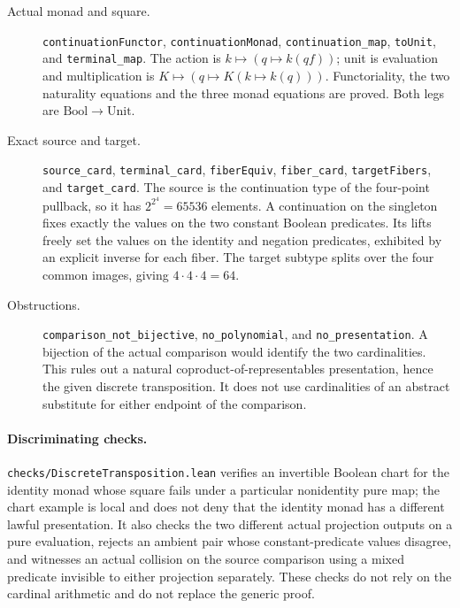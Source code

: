 \documentclass[11pt]{article}
\begin{document}
\begin{description}
\item[Actual monad and square.]
\nolinkurl{continuationFunctor}, \nolinkurl{continuationMonad},
\nolinkurl{continuation_map}, \nolinkurl{toUnit}, and
\nolinkurl{terminal_map}. The action is $k\mapsto(q\mapsto k(qf))$;
unit is evaluation and multiplication is
$K\mapsto(q\mapsto K(k\mapsto k(q)))$. Functoriality, the two
naturality equations and the three monad equations are proved. Both legs
are $\mathrm{Bool}\to\mathrm{Unit}$.
\item[Exact source and target.]
\nolinkurl{source_card}, \nolinkurl{terminal_card},
\nolinkurl{fiberEquiv}, \nolinkurl{fiber_card},
\nolinkurl{targetFibers}, and \nolinkurl{target_card}.
The source is the continuation type of the four-point pullback, so it
has $2^{2^4}=65536$ elements. A continuation on the singleton fixes exactly
the values on the two constant Boolean predicates. Its lifts freely set
the values on the identity and negation predicates, exhibited by an
explicit inverse for each fiber. The target subtype splits over the four
common images, giving $4\cdot4\cdot4=64$.
\item[Obstructions.]
\nolinkurl{comparison_not_bijective}, \nolinkurl{no_polynomial},
and \nolinkurl{no_presentation}. A bijection of the actual comparison
would identify the two cardinalities. This rules out a natural
coproduct-of-representables presentation, hence the given discrete
transposition. It does not use cardinalities of an abstract substitute
for either endpoint of the comparison.
\end{description}

\paragraph{Discriminating checks.}
\nolinkurl{checks/DiscreteTransposition.lean} verifies an invertible Boolean
chart for the identity monad whose square fails under a particular
nonidentity pure map; the chart example is local and does not deny that
the identity monad has a different lawful presentation. It also checks
the two different actual projection outputs on a pure evaluation, rejects
an ambient pair whose constant-predicate values disagree, and witnesses
an actual collision on the source comparison using a mixed predicate
invisible to either projection separately. These checks do not rely on
the cardinal arithmetic and do not replace the generic proof.
\end{document}
